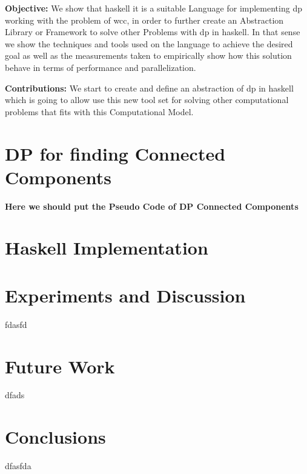\documentclass[12pt]{article}
\begin{document}
\textbf{Objective:} We show that \acrshort{haskell} it is a suitable Language for implementing \acrshort{dp} working with the problem of \acrshort{wcc}, in order to further create an Abstraction Library or Framework
to solve other Problems with \acrshort{dp} in \acrshort{haskell}.
In that sense we show the techniques and tools used on the language to achieve the desired goal as well as the measurements taken to empirically show how this solution behave in terms of performance and parallelization.

\textbf{Contributions:} We start to create and define an abstraction of \acrshort{dp} in \acrshort{haskell} which is going to allow use this new tool set for solving other computational problems that fits with this Computational Model.

\section{DP for finding Connected Components}
\textbf{Here we should put the Pseudo Code of DP Connected Components}

\section{Haskell Implementation}

\section{Experiments and Discussion}
fdasfd

\section{Future Work}
dfads

\section{Conclusions}
dfasfda

\clearpage

\printglossary[type=\acronymtype]

\printglossary




\appendix
\end{document}
